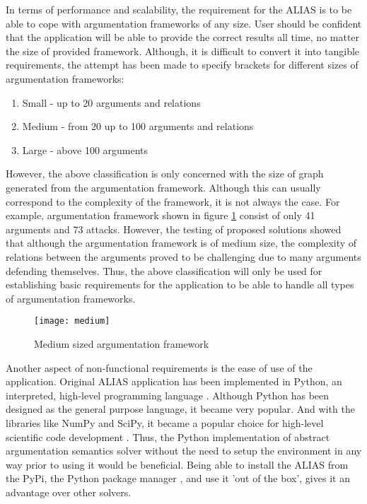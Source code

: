 In terms of performance and scalability, the requirement for the ALIAS is to be able to cope with argumentation frameworks of any size. User should be confident that the application will be able to provide the correct results all time, no matter the size of provided framework. Although, it is difficult to convert it into tangible requirements, the attempt has been made to specify brackets for different sizes of argumentation frameworks: 

\begin{enumerate}
	\item Small - up to 20 arguments and relations
	\item Medium - from 20 up to 100 arguments and relations
	\item Large - above 100 arguments 
\end{enumerate}

However, the above classification is only concerned with the size of graph generated from the argumentation framework. Although this can usually correspond to the complexity of the framework, it is not always the case. For example, argumentation framework shown in figure \ref{fig:mediumAF} consist of only 41 arguments and 73 attacks. However, the testing of proposed solutions showed that although the argumentation framework is of medium size, the complexity of relations between the arguments proved to be challenging due to many arguments defending themselves. Thus, the above classification will only be used for establishing basic requirements for the application to be able to handle all types of argumentation frameworks. 

\begin{figure}[h]
	\texttt{[image: medium]}
	\caption{Medium sized argumentation framework}
	\label{fig:mediumAF}
\end{figure}

Another aspect of non-functional requirements is the ease of use of the application. Original ALIAS application has been implemented in Python, an interpreted, high-level programming language \citep{millman2011python}. Although Python has been designed as the general purpose language, it became very popular. And with the libraries like NumPy and SciPy, it became a popular choice for high-level scientific code development \citep{perez2011python}. Thus, the Python implementation of abstract argumentation semantics solver without the need to setup the environment in any way prior to using it would be beneficial. Being able to install the ALIAS from the PyPi, the Python package manager \citep{pypi}, and use it 'out of the box', gives it an advantage over other solvers.
